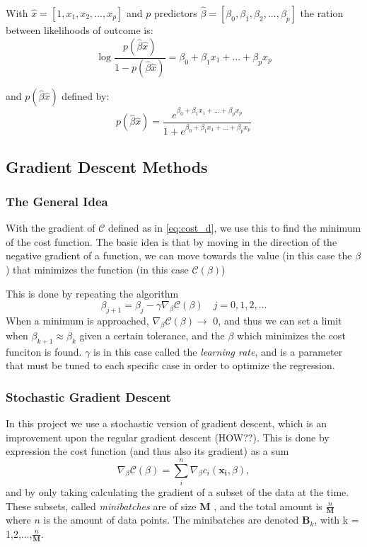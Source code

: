 With $\hat{x} = [1, x_1,x_2,...,x_p]$ and $p$ predictors $\hat{\beta} = [\beta_0,\beta_1,\beta_2,...,\beta_p]$ the ration between likelihoods of outcome is:
\begin{equation}
  \log \frac{p(\hat{\beta}\hat{x})}{1-p(\hat{\beta}\hat{x})} = \beta_0 + \beta_1x_1 + ... + \beta_px_p
  \label{eq:prob_ratio}
\end{equation}

\noindent and $p(\hat{\beta}\hat{x})$ defined by:
\begin{equation}
  p(\hat{\beta}\hat{x}) = \frac{e^{\beta_0 + \beta_1x_1 + ... + \beta_px_p}}{1+e^{\beta_0 + \beta_1x_1 + ... + \beta_px_p}}
  \label{eq:pBx}
\end{equation}

\subsection{Gradient Descent Methods}
\subsubsection{The General Idea}
With the gradient of $\mathcal{C}$ defined as in \eqref{eq:cost_d}, we use this to find the minimum of the cost function. The basic idea is that by moving in the direction of the negative gradient of a function, we can move towards the value (in this case the $\beta$) that minimizes the function (in this case $\mathcal{C}(\beta)$)

This is done by repeating the algorithm
\begin{equation}
    \beta_{j+1} = \beta_j - \gamma \nabla_\beta \mathcal{C}(\beta) \quad j = 0,1,2,...
    \label{eq:gradient_decent}
\end{equation}
When a minimum is approached, $\nabla_\beta \mathcal{C}(\beta) \rightarrow$ 0, and thus we can set a limit when $\beta_{k+1} \approx \beta_k$ given a certain tolerance, and the $\beta$ which minimizes the cost funciton is found. $\gamma$ is in this case called the \textit{learning rate}, and is a parameter that must be tuned to each specific case in order to optimize the regression.

\subsubsection{Stochastic Gradient Descent}
In this project we use a stochastic version of gradient descent, which is an improvement upon the regular gradient descent (HOW??). This is done by expression the cost function (and thus also its gradient) as a sum
\begin{equation}
    \nabla_\beta \mathcal{C}(\beta) = \sum_i^n     \nabla_\beta c_i(\boldsymbol{x_i},\beta) ,
    \label{eq:gradient_sum}
\end{equation}
and by only taking calculating the gradient of a subset of the data at the time. These subsets, called \textit{minibatches} are of size $\boldsymbol{M}$ , and the total amount is $\frac{n}{\boldsymbol{M}}$ where $n$ is the amount of data points. The minibatches are denoted $\boldsymbol{B}_k$, with k = 1,2,...,$\frac{n}{\boldsymbol{M}}$.

